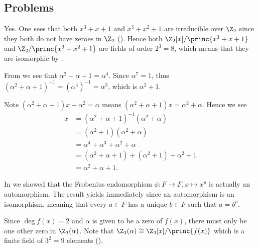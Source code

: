 \subsection*{Problems}
\begin{questions}
    \item Yes. One sees that both $x^3 + x + 1$ and $x^3 + x^2 + 1$ are irreducible over $\Z_2$ since they both do not have zeroes in $\Z_2$ (). Hence both $\Z_2[x]/\princ{x^3+x+1}$ and $\Z_2/\princ{x^3+x^2+1}$ are fields of order $2^3 = 8$, which means that they are isomorphic by .

    \item \begin{partquestions}{\roman*}
        \item From  we see that $\alpha^2 + \alpha + 1 = \alpha^4$. Since $\alpha^7 = 1$, thus $(\alpha^2 + \alpha + 1)^{-1} = (\alpha^4)^{-1} = \alpha^3$, which is $\alpha^2 + 1$.

        \item Note $(\alpha^2 + \alpha + 1)x + \alpha^2 = \alpha$ means $(\alpha^2 + \alpha + 1)x = \alpha^2 + \alpha$. Hence we see
        \begin{align*}
            x &= (\alpha^2+\alpha+1)^{-1}(\alpha^2 + \alpha)\\
            &= (\alpha^2 + 1)(\alpha^2 + \alpha)\\
            &= \alpha^4 + \alpha^3 + \alpha^2 + \alpha\\
            &= (\alpha^2 + \alpha + 1) + (\alpha^2 + 1) + \alpha^2 + 1\\
            &= \alpha^2 + \alpha + 1.
        \end{align*}
    \end{partquestions}

    \item In  we showed that the Frobenius endomorphism $\phi: F \to F, x \mapsto x^p$ is actually an automorphism. The result yields immediately since an automorphism is an isomorphism, meaning that every $a \in F$ has a unique $b \in F$ such that $a = b^p$.

    \item Since $\deg f(x) = 2$ and $\alpha$ is given to be a zero of $f(x)$, there must only be one other zero in $\Z_3(\alpha)$. Note that $\Z_3(\alpha) \cong \Z_3[x]/\princ{f(x)}$ which is a finite field of $3^2 = 9$ elements ().


\end{questions}

